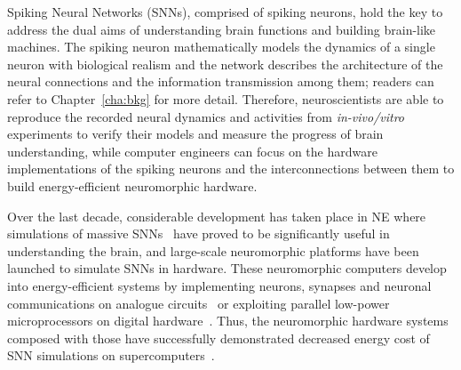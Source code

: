 \documentclass[10pt,journal,compsoc]{IEEEtran}
\begin{document}
Spiking Neural Networks (SNNs), comprised of spiking neurons, hold the key to address the dual aims of understanding brain functions and building brain-like machines.
The spiking neuron mathematically models the dynamics of a single neuron with biological realism and the network describes the architecture of the neural connections and the information transmission among them; readers can refer to Chapter~\ref{cha:bkg} for more detail.
Therefore, neuroscientists are able to reproduce the recorded neural dynamics and activities from \textit{in-vivo/vitro} experiments to verify their models and measure the progress of brain understanding,
while computer engineers can focus on the hardware implementations of the spiking neurons and the interconnections between them to build energy-efficient neuromorphic hardware.

Over the last decade, considerable development has taken place in NE where simulations of massive SNNs~\cite{markram2006blue,ananthanarayanan2009cat} have proved to be significantly useful in understanding the brain, and large-scale neuromorphic platforms have been launched to simulate SNNs in hardware.
These neuromorphic computers develop into energy-efficient systems by implementing neurons, synapses and neuronal communications on analogue circuits~\cite{schemmel2010wafer,benjamin2014neurogrid,yu201265k} or exploiting parallel low-power microprocessors on digital hardware~\cite{furber2014spinnaker,merolla2014million}. 
Thus, the neuromorphic hardware systems composed with those have successfully demonstrated decreased energy cost of SNN simulations on supercomputers~\cite{de2010world,sharp2012power}.
\end{document}
